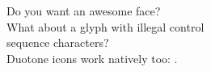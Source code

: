 \documentclass[varwidth, margin=5mm]{standalone}
\begin{document}
  Do you want an awesome face? \faFaceAwesome \\
  What about a glyph with illegal control \\
  sequence characters? \fasTransporterOne \\
  Duotone icons work natively too: \fadWandMagicSparkles.
\end{document}
